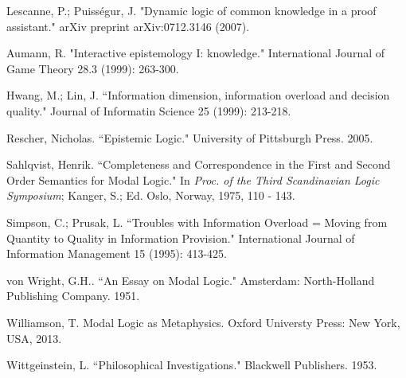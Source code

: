 \begin{thebibliography}{9}
	 	Lescanne, P.; Puiss\'egur, J. "Dynamic logic of common knowledge in a proof assistant." arXiv preprint arXiv:0712.3146 (2007).
	 	
	 	Aumann, R. "Interactive epistemology I: knowledge." International Journal of Game Theory 28.3 (1999): 263-300.
	 	
	 	Hwang, M.; Lin, J. ``Information dimension, information overload and decision quality." Journal of Informatin Science 25 (1999): 213-218.
	 	
	 	Rescher, Nicholas. ``Epistemic Logic." University of Pittsburgh Press. 2005.
	 	
	 	Sahlqvist, Henrik. ``Completeness and Correspondence in the First and Second Order Semantics for Modal Logic." In {\em Proc. of the Third Scandinavian Logic Symposium}; Kanger, S.; Ed. Oslo, Norway, 1975, 110 - 143.
	 	
	 	Simpson, C.; Prusak, L. ``Troubles with Information Overload = Moving from Quantity to Quality in Information Provision." International Journal of Information Management 15 (1995): 413-425.
	 	
	 	von Wright, G.H.. ``An Essay on Modal Logic." Amsterdam: North-Holland Publishing Company. 1951.
	 	
	 	Williamson, T. Modal Logic as Metaphysics. Oxford Universty Press: New York, USA, 2013.
	 	
	 	Wittgeinstein, L. ``Philosophical Investigations." Blackwell Publishers. 1953.
\end{thebibliography}
